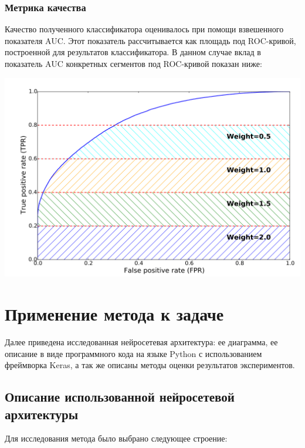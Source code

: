 \documentclass[14pt, a4paper]{extarticle}
\begin{document}
\subsubsection{Метрика качества}
\label{quality_metrics}
Качество полученного классификатора оценивалось при помощи взвешенного показателя AUC. Этот показатель рассчитывается как площадь под ROC-кривой, построенной для результатов классификатора. В данном случае вклад в показатель AUC конкретных сегментов под ROC-кривой показан ниже:

\begin{center}
	\includegraphics[scale=0.8]{auc.png}
\end{center}


\newpage
\section{Применение метода к задаче}
\label{paragraph:architecture}

Далее приведена исследованная нейросетевая архитектура: ее диаграмма, ее описание в виде программного кода на языке Python с использованием фреймворка Keras, а так же описаны методы оценки результатов экспериментов.

\subsection{Описание использованной нейросетевой архитектуры}

Для исследования метода было выбрано следующее строение: %
\end{document}
